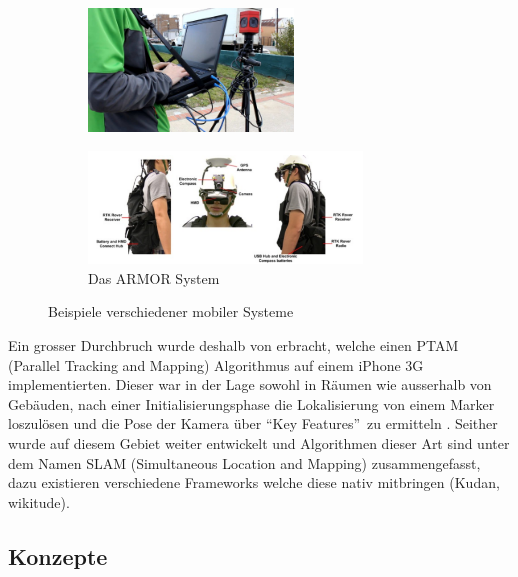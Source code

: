 \documentclass[a4paper]{scrreprt}
\begin{document}
\begin{figure}[h!]
	\begin{subfigure}[b]{0.45\textwidth}
		\centering
		\includegraphics[keepaspectratio, width=0.6\textwidth]{LiveMobilePanoramicAR.png}
		\caption{\parencite{Cote2013}}
	\end{subfigure}
	\quad
	\begin{subfigure}[b]{0.45\textwidth}
		\centering
		\includegraphics[keepaspectratio, width=0.8\textwidth]{ARMOR_System2013.png}
		\caption{Das ARMOR System \parencite{Dong2013}}
	\end{subfigure}
	\caption{Beispiele verschiedener mobiler Systeme}
	\label{fig:MobileSysteme}
\end{figure}

Ein grosser Durchbruch wurde deshalb von \citeauthor{Klein2009} erbracht, welche einen PTAM (Parallel Tracking and Mapping) Algorithmus auf einem iPhone 3G implementierten. Dieser war in der Lage sowohl in Räumen wie ausserhalb von Gebäuden, nach einer Initialisierungsphase die Lokalisierung von einem Marker loszulösen und die Pose der Kamera über \textquotedblleft Key Features\textquotedblright\ zu ermitteln \parencite{Klein2009}. Seither wurde auf diesem Gebiet weiter entwickelt und Algorithmen dieser Art sind unter dem Namen SLAM (Simultaneous Location and Mapping) zusammengefasst, dazu existieren verschiedene Frameworks welche diese nativ mitbringen (Kudan, wikitude).

\subsection{Konzepte}
\end{document}
